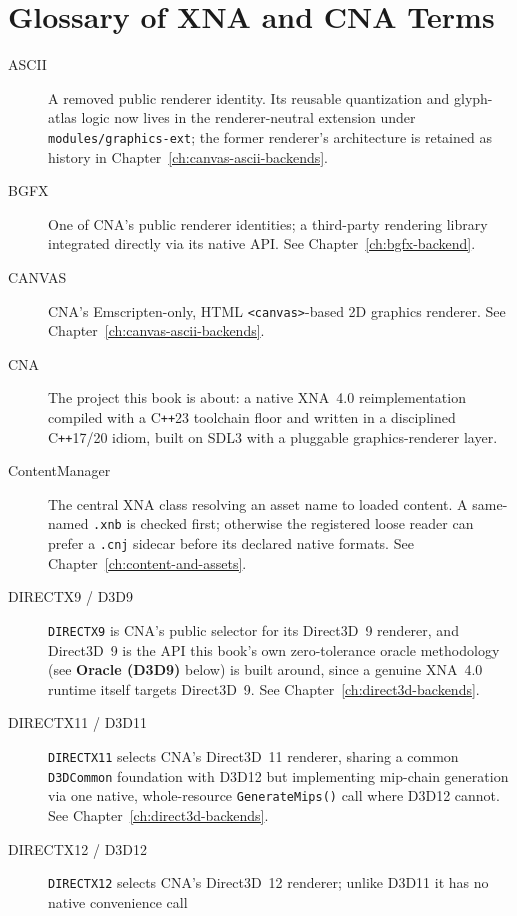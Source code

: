 \chapter{Glossary of XNA and CNA Terms}
\label{ch:glossary}

\begin{description}
\item[ASCII] A removed public renderer identity. Its reusable quantization and glyph-atlas logic
  now lives in the renderer-neutral  extension
  under \texttt{modules/graphics-ext}; the former renderer's architecture is retained as history
  in Chapter~\ref{ch:canvas-ascii-backends}.
\item[BGFX] One of CNA's \RendererIdentityCount{} public renderer identities; a third-party rendering library integrated
  directly via its native API. See Chapter~\ref{ch:bgfx-backend}.
\item[CANVAS] CNA's Emscripten-only, HTML \texttt{<canvas>}-based 2D graphics renderer. See
  Chapter~\ref{ch:canvas-ascii-backends}.
\item[CNA] The project this book is about: a native XNA~4.0 reimplementation compiled with a
  C\texttt{++}23 toolchain floor and written in a disciplined C\texttt{++}17/20 idiom, built on
  SDL3 with a pluggable graphics-renderer layer.
\item[ContentManager] The central XNA class resolving an asset name to loaded content. A same-
  named \texttt{.xnb} is checked first; otherwise the registered loose reader can prefer a
  \texttt{.cnj} sidecar before its declared native formats. See
  Chapter~\ref{ch:content-and-assets}.
\item[DIRECTX9 / D3D9] \texttt{DIRECTX9} is CNA's public selector for its Direct3D~9
  renderer, and Direct3D~9 is the API this book's own zero-tolerance
  oracle methodology (see \textbf{Oracle (D3D9)} below) is built around, since a genuine XNA~4.0
  runtime itself targets Direct3D~9. See Chapter~\ref{ch:direct3d-backends}.
\item[DIRECTX11 / D3D11] \texttt{DIRECTX11} selects CNA's Direct3D~11 renderer, sharing a common \texttt{D3DCommon} foundation
  with D3D12 but implementing mip-chain generation via one native, whole-resource
  \texttt{GenerateMips()} call where D3D12 cannot. See Chapter~\ref{ch:direct3d-backends}.
\item[DIRECTX12 / D3D12] \texttt{DIRECTX12} selects CNA's Direct3D~12 renderer; unlike D3D11 it has no native convenience call

\end{description}
